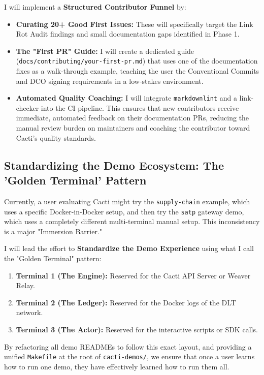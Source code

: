 I will implement a \textbf{Structured Contributor Funnel} by:
\begin{itemize}[leftmargin=*]
    \item \textbf{Curating 20+ Good First Issues:} These will specifically target the Link Rot Audit findings and small documentation gaps identified in Phase 1.
    \item \textbf{The "First PR" Guide:} I will create a dedicated guide (\texttt{docs/contributing/your-first-pr.md}) that uses one of the documentation fixes as a walk-through example, teaching the user the Conventional Commits and DCO signing requirements in a low-stakes environment.
    \item \textbf{Automated Quality Coaching:} I will integrate \texttt{markdownlint} and a link-checker into the CI pipeline. This ensures that new contributors receive immediate, automated feedback on their documentation PRs, reducing the manual review burden on maintainers and coaching the contributor toward Cacti's quality standards.
\end{itemize}

\subsection{Standardizing the Demo Ecosystem: The 'Golden Terminal' Pattern}
Currently, a user evaluating Cacti might try the \texttt{supply-chain} example, which uses a specific Docker-in-Docker setup, and then try the \texttt{satp} gateway demo, which uses a completely different multi-terminal manual setup. This inconsistency is a major "Immersion Barrier."

I will lead the effort to \textbf{Standardize the Demo Experience} using what I call the "Golden Terminal" pattern:
\begin{enumerate}[leftmargin=*]
    \item \textbf{Terminal 1 (The Engine):} Reserved for the Cacti API Server or Weaver Relay.
    \item \textbf{Terminal 2 (The Ledger):} Reserved for the Docker logs of the DLT network.
    \item \textbf{Terminal 3 (The Actor):} Reserved for the interactive scripts or SDK calls.
\end{enumerate}
By refactoring all demo READMEs to follow this exact layout, and providing a unified \texttt{Makefile} at the root of \texttt{cacti-demos/}, we ensure that once a user learns how to run one demo, they have effectively learned how to run them all.

